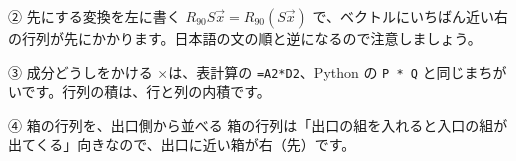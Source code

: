 \begin{tsumazuki}{② 先にする変換を左に書く}
$R_{90}S\vec x=R_{90}(S\vec x)$ で、ベクトルにいちばん近い右の行列が先にかかります。日本語の文の順と逆になるので注意しましょう。
\end{tsumazuki}

\begin{tsumazuki}{③ 成分どうしをかける}
×は、表計算の \texttt{=A2*D2}、Python の \texttt{P * Q} と同じまちがいです。行列の積は、行と列の内積です。
\end{tsumazuki}

\begin{tsumazuki}{④ 箱の行列を、出口側から並べる}
箱の行列は「出口の組を入れると入口の組が出てくる」向きなので、出口に近い箱が右（先）です。
\end{tsumazuki}

